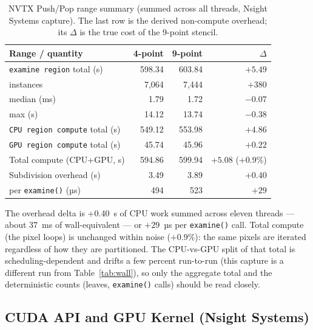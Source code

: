 \documentclass[
	english,
	letterpaper, oneside
]{article}
\begin{document}
\begin{table}[H]
    \centering
    \caption{NVTX Push/Pop range summary (summed across all threads, Nsight
             Systems capture). The last row is the derived non-compute overhead;
             its $\Delta$ is the true cost of the 9-point stencil.}
    \label{tab:nvtx}
    \begin{tabular}{lrrr}
        \hline
        Range / quantity & 4-point & 9-point & $\Delta$ \\
        \hline
        \texttt{examine region} total (s)  & 598.34 & 603.84 & $+5.49$ \\
        \quad instances                    & 7{,}064 & 7{,}444 & $+380$ \\
        \quad median (ms)                  & 1.79   & 1.72   & $-0.07$ \\
        \quad max (s)                      & 14.12  & 13.74  & $-0.38$ \\
        \texttt{CPU region compute} total (s) & 549.12 & 553.98 & $+4.86$ \\
        \texttt{GPU region compute} total (s) & 45.74  & 45.96  & $+0.22$ \\
        \hline
        Total compute (CPU+GPU, s)         & 594.86 & 599.94 & $+5.08$ ($+0.9\%$) \\
        Subdivision overhead (s)  & 3.49 & 3.89 & $+0.40$ \\
        \quad per \texttt{examine()} (µs)  & 494    & 523    & $+29$ \\
        \hline
    \end{tabular}
\end{table}

The overhead delta is +0.40~s of CPU work summed across eleven threads
--- about 37~ms of wall-equivalent --- or $+29$~µs per \texttt{examine()} call.
Total compute (the pixel loops) is unchanged within noise ($+0.9\%$): the same
pixels are iterated regardless of how they are partitioned. The CPU-vs-GPU
split of that total is scheduling-dependent and drifts a few percent
run-to-run (this capture is a different run from Table~\ref{tab:wall}), so only
the aggregate total and the deterministic counts (leaves, \texttt{examine()}
calls) should be read closely.

\subsection{CUDA API and GPU Kernel (Nsight Systems)}
\end{document}
